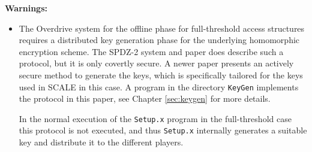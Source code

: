 \vspace{5mm}

\noindent
{\bf Warnings:}
\begin{itemize}
\item
The Overdrive system \cite{KPR} for the offline phase
for full-threshold access structures requires a distributed key 
generation phase for the underlying homomorphic encryption scheme. 
The SPDZ-2 system and paper does describe such a protocol, but it is only
covertly secure. 
A newer paper \cite{SPDZKG} presents an actively secure method
to generate the keys, which is specifically tailored for the keys
used in SCALE in this case.
A program in the directory \verb|KeyGen| implements the protocol
in this paper, see Chapter \ref{sec:keygen} for
more details.

In the normal execution of the \verb|Setup.x| program in the
full-threshold case this protocol is not executed, and thus
\verb|Setup.x| internally generates a suitable
key and distribute it to the different players.
\end{itemize}


